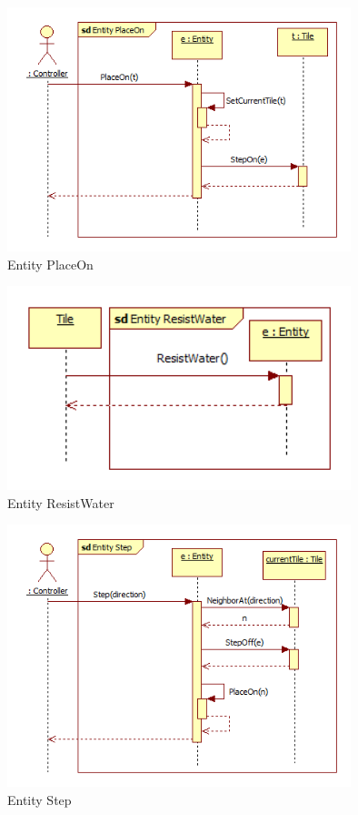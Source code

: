 \begin{figure}[H]
        \begin{center}
                \includegraphics[width=10cm]{chapters/chapter07/seqdiag/Entity_PlaceOn.png}
                \caption{Entity PlaceOn}
                \label{Entity PlaceOn}
        \end{center}
\end{figure}
\begin{figure}[H]
        \begin{center}
                \includegraphics[width=10cm]{chapters/chapter07/seqdiag/Entity_ResistWater.png}
                \caption{Entity ResistWater}
                \label{Entity ResistWater}
        \end{center}
\end{figure}
\begin{figure}[H]
        \begin{center}
                \includegraphics[width=10cm]{chapters/chapter07/seqdiag/Entity_Step.png}
                \caption{Entity Step}
                \label{Entity Step}
        \end{center}
\end{figure}
